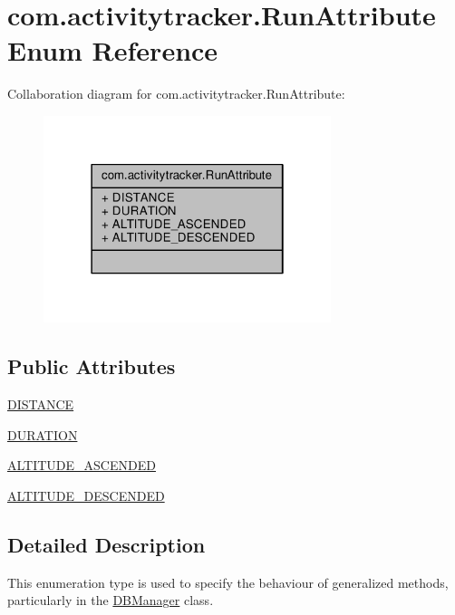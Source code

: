 \hypertarget{enumcom_1_1activitytracker_1_1_run_attribute}{}\section{com.\+activitytracker.\+Run\+Attribute Enum Reference}
\label{enumcom_1_1activitytracker_1_1_run_attribute}


Collaboration diagram for com.\+activitytracker.\+Run\+Attribute\+:
\nopagebreak
\begin{figure}[H]
\begin{center}
\leavevmode
\includegraphics[width=238pt]{enumcom_1_1activitytracker_1_1_run_attribute__coll__graph}
\end{center}
\end{figure}
\subsection*{Public Attributes}
\begin{DoxyCompactItemize}
\item 
\hyperlink{enumcom_1_1activitytracker_1_1_run_attribute_a90ee541e68e458a0bb3f5ea45fd46ec0}{D\+I\+S\+T\+A\+N\+CE}
\item 
\hyperlink{enumcom_1_1activitytracker_1_1_run_attribute_a7adf133b2a62f1f99ffc2adfb7097ec9}{D\+U\+R\+A\+T\+I\+ON}
\item 
\hyperlink{enumcom_1_1activitytracker_1_1_run_attribute_abcfe85bf48187d67842a0525c1bcc0af}{A\+L\+T\+I\+T\+U\+D\+E\+\_\+\+A\+S\+C\+E\+N\+D\+ED}
\item 
\hyperlink{enumcom_1_1activitytracker_1_1_run_attribute_a337a68867cfdb8ec7a17c318ad8b216b}{A\+L\+T\+I\+T\+U\+D\+E\+\_\+\+D\+E\+S\+C\+E\+N\+D\+ED}
\end{DoxyCompactItemize}


\subsection{Detailed Description}
This enumeration type is used to specify the behaviour of generalized methods, particularly in the \hyperlink{classcom_1_1activitytracker_1_1_d_b_manager}{D\+B\+Manager} class. 

